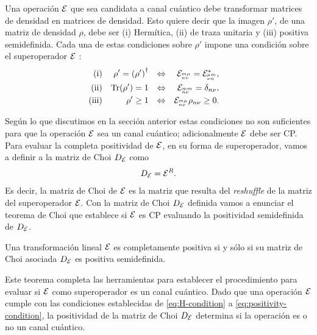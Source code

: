 Una operación $\mathcal{E}$ que sea candidata a canal cuántico debe transformar 
matrices de densidad en matrices de densidad. Esto quiere decir que
la imagen $\rho'$, de una matriz de densidad $\rho$, debe ser (i) Hermítica, 
(ii) de traza unitaria y (iii) positiva semidefinida. 
Cada una de estas condiciones sobre $\rho'$ impone una condición 
sobre el superoperador $\mathcal{E}$ \cite{bengtsson_zyczkowski_2017}:
\begin{align}
\text{(i)}&& \rho'=\qty(\rho')^{\dagger}&&\Leftrightarrow
    && \mathcal{E}_{{}^{m\mu}_{n\nu}}=\mathcal{E}_{{}^{\mu m}_{\nu n}}^*,&&
    \label{eq:H-condition}\\
\text{(ii)}&&\Tr(\rho')=1
    &&\Leftrightarrow&&  \mathcal{E}_{{}^{mm}_{n\nu}}=\delta_{n\nu},\\     
\text{(iii)}&&\rho'\geq1
    &&\Leftrightarrow&&  \mathcal{E}_{{}^{m\mu}_{n\nu}}\rho_{n\nu}\geq0.
    \label{eq:positivity-condition}
\end{align}



Según lo que discutimos en la sección anterior estas condiciones
no son suficientes para que la operación $\mathcal{E}$ sea un canal cuántico; adicionalmente 
$\mathcal{E}$ debe ser CP. Para evaluar la completa positividad de $\mathcal{E}$, en su forma 
de superoperador, vamos a definir a la matriz de Choi $D_{\mathcal{E}}$ como 
\cite{bengtsson_zyczkowski_2017}
\begin{align}
D_{\mathcal{E}}=\mathcal{E}^{R}.
\end{align}
Es decir, la matriz de Choi de $\mathcal{E}$ es la matriz que resulta del \textit{reshuffle}
de la matriz del superoperador $\mathcal{E}$. 
Con la matriz de Choi $D_{\mathcal{E}}$ definida vamos a enunciar 
el teorema de Choi \cite{bengtsson_zyczkowski_2017} que
establece si $\mathcal{E}$ es CP evaluando la positividad semidefinida de $D_{\mathcal{E}}$.
\begin{teorema}
Una transformación lineal $\mathcal{E}$ es completamente positiva si y sólo si 
su matriz de Choi asociada $D_{\mathcal{E}}$ es positiva semidefinida.
\end{teorema}
Este teorema completa las herramientas para establecer el procedimiento 
para evaluar si $\mathcal{E}$ como superoperador es un canal cuántico. 
Dado que una operación $\mathcal{E}$ cumple con las condiciones establecidas de
\eqref{eq:H-condition} a \eqref{eq:positivity-condition}, la positividad
de la matriz de Choi $D_{\mathcal{E}}$ determina si la operación es 
o no un canal cuántico.


